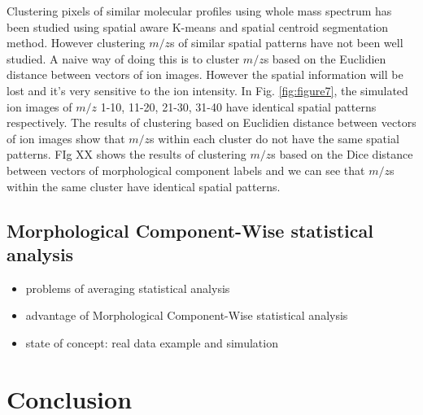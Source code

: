 \documentclass{bioinfo}
\begin{document}
Clustering pixels of similar molecular profiles using whole mass spectrum has been studied using spatial aware K-means and spatial centroid segmentation method. However clustering $m/z$s of similar spatial patterns have not been well studied. A naive way of doing this is to cluster $m/z$s based on the Euclidien distance between vectors of ion images. However the spatial information will be lost and it's very sensitive to the ion intensity. In Fig. \ref{fig:figure7}, the simulated ion images of $m/z$ 1-10, 11-20, 21-30, 31-40 have identical spatial patterns respectively. The results of clustering based on Euclidien distance between vectors of ion images show that $m/z$s within each cluster do not have the same spatial patterns. FIg XX shows the results of clustering $m/z$s based on the Dice distance between vectors of morphological component labels and we can see that $m/z$s within the same cluster have identical spatial patterns.

\subsection{Morphological Component-Wise statistical analysis}


\begin{itemize}
\item problems of averaging statistical analysis
\item advantage of Morphological Component-Wise statistical analysis
\item state of concept: real data example and simulation
\end{itemize}









%
%






\section{Conclusion}
\end{document}
